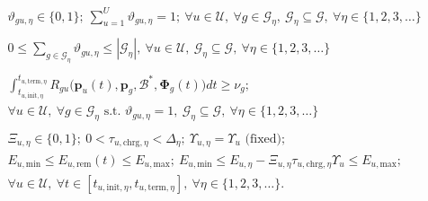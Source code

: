 \documentclass{article}
\begin{document}
\begin{align}
    &\vartheta_{gu,\eta}{\in}\{0,1\};\ \sum_{u{=}1}^{U}\vartheta_{gu,\eta}{=}1;\ {\forall}u{\in}\mathcal{U},\ {\forall}g{\in}\mathcal{G}_{\eta},\ \mathcal{G}_{\eta}{\subseteq}\mathcal{G},\ {\forall}\eta{\in}\{1,2,3,{\dots}\}\label{GN_scheduling_and_association_constraints}\tag{C.7}\\\nonumber\\
    &0{\leq}\sum_{g{\in}\mathcal{G}_{\eta}}\vartheta_{gu,\eta}{\leq}|\mathcal{G}_{\eta}|,\ {\forall}u{\in}\mathcal{U},\ \mathcal{G}_{\eta}{\subseteq}\mathcal{G},\ {\forall}\eta{\in}\{1,2,3,{\dots}\}\label{Simultaneous_GN_services}\tag{C.8}\\\nonumber\\
    &\int_{t_{u,\mathrm{init},\eta}}^{t_{u,\mathrm{term},\eta}}R_{gu}\Big(\mathbf{p}_{u}(t),\mathbf{p}_{g},\mathcal{B}^{*},\boldsymbol{\Phi}_{g}(t)\Big)dt{\geq}\nu_{g};\nonumber\\
    &{\forall}u{\in}\mathcal{U},\ {\forall}g{\in}\mathcal{G}_{\eta}\text{ s.t. }\vartheta_{gu,\eta}{=}1,\ \mathcal{G}_{\eta}{\subseteq}\mathcal{G},\ {\forall}\eta{\in}\{1,2,3,{\dots}\}\label{Full_GN_service}\tag{C.9}\\\nonumber\\
    &\Xi_{u,\eta}{\in}\{0,1\};\ 0{<}\tau_{u,\mathrm{chrg},\eta}{<}\Delta_{\eta};\ \Upsilon_{u,\eta}{=}\Upsilon_{u}\text{ (fixed)};\nonumber\\
    &E_{u,\mathrm{min}}{\leq}E_{u,\mathrm{rem}}(t){\leq}E_{u,\mathrm{max}};\ E_{u,\mathrm{min}}{\leq}E_{u,\eta}{-}\Xi_{u,\eta}\tau_{u,\mathrm{chrg},\eta}\Upsilon_{u}{\leq}E_{u,\mathrm{max}};\nonumber\\
    &{\forall}u{\in}\mathcal{U},\ {\forall}t{\in}\left[t_{u,\mathrm{init},\eta},t_{u,\mathrm{term},\eta}\right],\ {\forall}\eta{\in}\{1,2,3,{\dots}\}.\label{Charging_and_UAV_energy_constraints}\tag{C.10}
\end{align}
\end{document}
